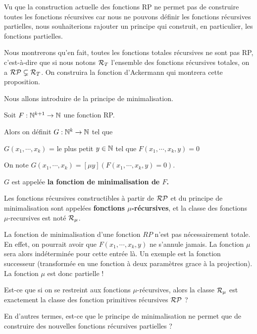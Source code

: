 Vu que la construction actuelle des fonctions RP ne permet pas de construire
toutes les fonctions récursives car nous ne pouvons définir les fonctions
récursives partielles, nous souhaiterions rajouter un principe qui construit, en
particulier, les fonctions partielles.

Nous montrerons qu'en fait, toutes les fonctions totales récursives ne sont pas
RP, c'est-à-dire que si nous notons $\mathcal{R}_{T}$ l'ensemble des
fonctions récursives totales, on a $\mathcal{RP} \subsetneq
\mathcal{R}_{T}$. On construira la fonction
d'Ackermann qui montrera cette proposition.

Nous allons introduire de la principe de minimalisation.

\begin{definition} 
	Soit $F : \mathbb{N}^{k + 1} \rightarrow \mathbb{N}$ une fonction RP.

	Alors on définit
	$G : \mathbb{N}^{k} \rightarrow \mathbb{N}$ tel que

	$G(x_{1}, \cdots, x_{k})$ = le plus petit $y \in \mathbb{N}$ tel que $F(x_{1}, \cdots, x_{k}, y) = 0$

On note $G(x_{1}, \cdots, x_{k}) = [\mu y](F(x_{1}, \cdots, x_{k}, y) = 0)$.

	$G$ est appelée \textbf{la fonction de minimalisation de $F$.}

	Les fonctions récursives constructibles à partir de
	$\mathcal{RP}$ et du principe de minimalisation sont
	appelées \textbf{fonctions $\mu$-récursives}, et la classe des fonctions
	$\mu$-recursives est noté $\mathcal{R}_{\mu}$.
\end{definition}

\begin{remarque}
	La fonction de minimalisation d'une fonction $RP$ n'est pas nécessairement
	totale. En effet, on pourrait avoir que $F(x_{1}, \cdots, x_{k}, y)$ ne
	s'annule jamais. La fonction $\mu$ sera alors indéterminée pour cette entrée
	là. Un exemple est la fonction successeur (transformée en une fonction à
	deux paramètres grace à la projection).  La fonction $\mu$ est donc
	partielle !
\end{remarque}

\begin{question} Est-ce que si on se restreint aux fonctions $\mu$-récursives,
	alors la classe $\mathcal{R}_{\mu}$ est exactement la classe des
	fonction primitives récursives $\mathcal{RP}$ ?

	En d'autres termes, est-ce que le principe de minimalisation ne permet que
	de construire des nouvelles fonctions récursives partielles ?
\end{question}

